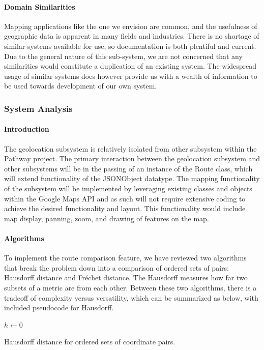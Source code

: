 \documentclass{article}
\begin{document}
\paragraph{Domain Similarities}
Mapping applications like the one we envision are common, and the usefulness of geographic data is apparent in many fields and industries. There is no shortage of similar systems available for use, so documentation is both plentiful and current. Due to the general nature of this sub-system, we are not concerned that any similarities would constitute a duplication of an existing system. The widespread usage of similar systems does however provide us with a wealth of information to be used towards development of our own system.

\subsubsection{System Analysis}
\paragraph{Introduction}
The geolocation subsystem is relatively isolated from other subsystem within the Pathway project. The primary interaction between the geolocation
subsystem and other subsystems will be in the passing of an instance of the Route class, which will extend functionality of the JSONObject datatype. The mapping functionality of the subsystem will be implemented by leveraging existing classes and objects within
the Google Maps API and as such will not require extensive coding to achieve the desired functionality and layout.
This functionality would include map display, panning, zoom, and drawing of features on the map.


\paragraph{Algorithms}
To implement the route comparison feature, we have reviewed two algorithms that break the problem down into a comparison of ordered sets of pairs:
Hausdorff distance and Fréchet distance.
The Hausdorff measures how far two subsets of a metric are from each other. \cite{g_hausdorff}Between these two algorithms, there is a tradeoff of complexity versus versatility,
which can be summarized as below, with included pseudocode for Hausdorff.

\begin{algorithm}[h]
\SetAlgoLined
$h \gets 0$\\
\caption{Hausdorff distance for ordered sets of coordinate pairs.}
\end{algorithm}
\end{document}
